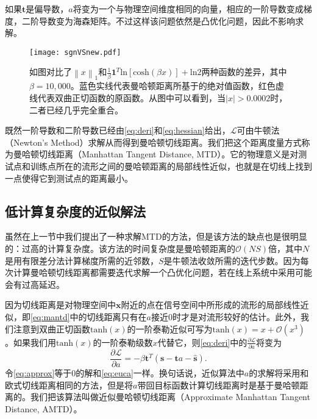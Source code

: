 如果$\mathbf{t}$是偏导数，$a$将变为一个与物理空间维度相同的向量，相应的一阶导数变成梯度，二阶导数变为海森矩阵。不过这样该问题依然是凸优化问题，因此不影响求解。

\begin{figure}
	\centering
	\texttt{[image: sgnVSnew.pdf]}
	\caption{如图对比了${\left\| x \right\|}_1$和$\frac{1}{\beta}\mathbf{1}^T\mathrm{ln}\left[ \mathrm{cosh} \left( \beta x \right) \right] + \mathrm{ln}2$两种函数的差异，其中$\beta=10,000$。蓝色实线代表曼哈顿距离所基于的绝对值函数，红色虚线代表双曲正切函数的原函数。从图中可以看到，当$|x|>0.0002$时，二者已经几乎完全重合。}
	\label{fig:sgnVSnew}
\end{figure}

既然一阶导数和二阶导数已经由\eqref{eq:deri}和\eqref{eq:hessian}给出，$\mathcal{L}$可由牛顿法（Newton's Method）求解从而得到曼哈顿切线距离。我们把这个距离度量方式称为曼哈顿切线距离（Manhattan Tangent Distance, MTD）。它的物理意义是对测试点和训练点所在的流形之间的曼哈顿距离的局部线性近似，也就是在切线上找到一点使得它到测试点的距离最小。

\subsection{低计算复杂度的近似解法}

虽然在上一节中我们提出了一种求解MTD的方法，但是该方法的缺点也是很明显的：过高的计算复杂度。该方法的时间复杂度是曼哈顿距离的$\mathcal{O}(NS)$倍，其中$N$是用有限差分法计算梯度所需的近邻数，$S$是牛顿法收敛所需的迭代步数。因为每次计算曼哈顿切线距离都需要迭代求解一个凸优化问题，若在线上系统中采用可能会有过高延迟。

因为切线距离是对物理空间中$\mathbf{x}$附近的点在信号空间中所形成的流形的局部线性近似，即\eqref{eq:mantd}中的切线距离只有在$a$接近0时才是对流形较好的估计。此外，我们注意到双曲正切函数$\mathrm{tanh}(x)$的一阶泰勒近似可写为$\mathrm{tanh}(x) = x + \mathcal{O}\left( x^3 \right)$。如果我们用$\mathrm{tanh}(x)$的一阶泰勒级数$x$代替它，则\eqref{eq:deri}中的$\frac{\partial \mathcal{L}}{\partial a}$将变为
\begin{equation}
\frac{\partial \mathcal{L}}{\partial a} = -\beta \mathbf{t}^T \left( \mathbf{s} - \mathbf{t}a - \widehat{\mathbf{s}} \right). \label{eq:approx}
\end{equation}
令\eqref{eq:approx}等于0的解和\eqref{eq:euca}一样。换句话说，近似算法中$a$的求解将采用和欧式切线距离相同的方法，但是将$a$带回目标函数计算切线距离时是基于曼哈顿距离的。我们把该算法叫做近似曼哈顿切线距离（Approximate Manhattan Tangent Distance, AMTD）。

